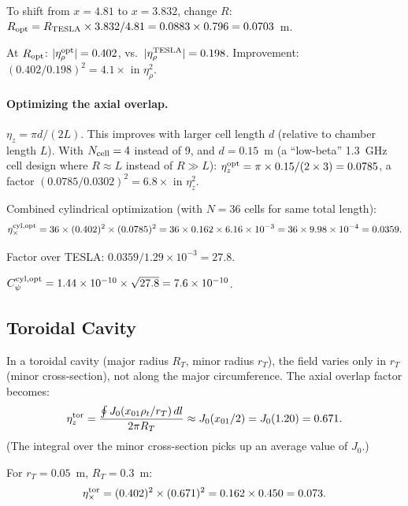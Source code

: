 \documentclass[11pt]{article}
\newcommand{\ee}[1]{\times 10^{#1}}
\begin{document}
To shift from $x = 4.81$ to $x = 3.832$, change $R$:
$R_{\rm opt} = R_{\rm TESLA} \times 3.832/4.81 = 0.0883 \times 0.796 = 0.0703$~m.

At $R_{\rm opt}$: $|\eta_\rho^{\rm opt}| = 0.402$, vs.\ $|\eta_\rho^{\rm TESLA}| = 0.198$.
Improvement: $(0.402/0.198)^2 = 4.1\times$ in $\eta_\rho^2$.

\paragraph{Optimizing the axial overlap.}

$\eta_z = \pi d/(2L)$. This improves with larger cell length $d$ (relative to
chamber length $L$). With $N_{\rm cell} = 4$ instead of 9, and $d = 0.15$~m
(a ``low-beta'' 1.3~GHz cell design where $R \approx L$ instead of $R \gg L$):
$\eta_z^{\rm opt} = \pi \times 0.15/(2 \times 3) = 0.0785$, a factor
$(0.0785/0.0302)^2 = 6.8\times$ in $\eta_z^2$.

Combined cylindrical optimization (with $N = 36$ cells for same total length):
\begin{equation}
\eta_\times^{\rm cyl,opt} = 36 \times (0.402)^2 \times (0.0785)^2 = 36 \times 0.162 \times 6.16\ee{-3}
= 36 \times 9.98\ee{-4} = 0.0359.
\end{equation}

Factor over TESLA: $0.0359/1.29\ee{-3} = 27.8$.

$C_\psi^{\rm cyl,opt} = 1.44\ee{-10} \times \sqrt{27.8} = 7.6\ee{-10}$.

\subsection{Toroidal Cavity}

In a toroidal cavity (major radius $R_T$, minor radius $r_T$), the field
varies only in $r_T$ (minor cross-section), not along the major circumference.
The axial overlap factor becomes:
\begin{equation}
\eta_z^{\rm tor} = \frac{\oint J_0(x_{01}\rho_t/r_T)\,dl}{2\pi R_T}
\approx J_0(x_{01}/2) = J_0(1.20) = 0.671.
\end{equation}
(The integral over the minor cross-section picks up an average value of $J_0$.)

For $r_T = 0.05$~m, $R_T = 0.3$~m:
\begin{equation}
\eta_\times^{\rm tor} = (0.402)^2 \times (0.671)^2 = 0.162 \times 0.450 = 0.073.
\end{equation}
\end{document}
